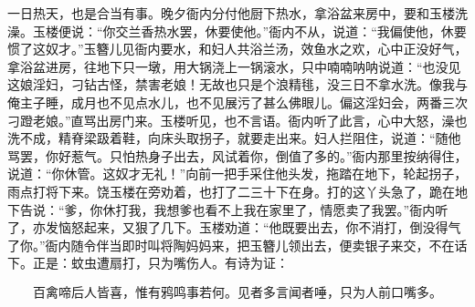 一日热天，也是合当有事。晚夕衙内分付他厨下热水，拿浴盆来房中，要和玉楼洗澡。玉楼便说：“你交兰香热水罢，休要使他。”衙内不从，说道：“我偏使他，休要惯了这奴才。”玉簪儿见衙内要水，和妇人共浴兰汤，效鱼水之欢，心中正没好气，拿浴盆进房，往地下只一墩，用大锅浇上一锅滚水，只中喃喃呐呐说道：“也没见这娘淫妇，刁钻古怪，禁害老娘！无故也只是个浪精毴，没三日不拿水洗。像我与俺主子睡，成月也不见点水儿，也不见展污了甚么佛眼儿。偏这淫妇会，两番三次刁蹬老娘。”直骂出房门来。玉楼听见，也不言语。衙内听了此言，心中大怒，澡也洗不成，精脊梁趿着鞋，向床头取拐子，就要走出来。妇人拦阻住，说道：“随他骂罢，你好惹气。只怕热身子出去，风试着你，倒值了多的。”衙内那里按纳得住，说道：“你休管。这奴才无礼！”向前一把手采住他头发，拖踏在地下，轮起拐子，雨点打将下来。饶玉楼在旁劝着，也打了二三十下在身。打的这丫头急了，跪在地下告说：“爹，你休打我，我想爹也看不上我在家里了，情愿卖了我罢。”衙内听了，亦发恼怒起来，又狠了几下。玉楼劝道：“他既要出去，你不消打，倒没得气了你。”衙内随令伴当即时叫将陶妈妈来，把玉簪儿领出去，便卖银子来交，不在话下。正是：蚊虫遭扇打，只为嘴伤人。有诗为证：

\[
百禽啼后人皆喜，惟有鸦鸣事若何。
见者多言闻者唾，只为人前口嘴多。
\]
